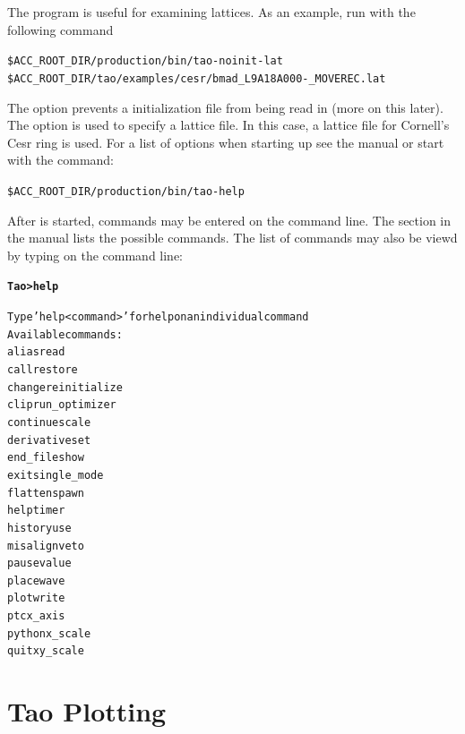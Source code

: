 \documentclass{hitec}
\newcommand{\BF}[1]{{\normalfont\textbf{#1}}}
\newenvironment{display}
  {\vspace*{-1.5ex} \begin{alltt}}
  {\end{alltt} \vspace*{-1.0ex}}
\begin{document}
The \tao program is useful for examining lattices. As an example, run \tao with
the following command
\begin{display}
  \$ACC_ROOT_DIR/production/bin/tao -noinit -lat \B
              \$ACC_ROOT_DIR/tao/examples/cesr/bmad_L9A18A000-_MOVEREC.lat
\end{display}
The  option prevents a \tao initialization file from being read in (more
on this later). The  option is used to specify a lattice file. In this case,
a lattice file for Cornell's Cesr ring is used. For a list of options when starting
up \tao see the \tao manual or start \tao with the command:
\begin{display}
  \$ACC_ROOT_DIR/production/bin/tao -help
\end{display}

After \tao is started, commands may be entered on the command line. The section
\tao {} in the \tao manual lists the possible commands. The list
of commands may also be viewd by typing  on the command line:
\begin{display}
  \BF{Tao> help}

  Type 'help <command>' for help on an individual command
  Available commands:
    alias                             read
    call                              restore
    change                            reinitialize
    clip                              run_optimizer
    continue                          scale
    derivative                        set
    end_file                          show
    exit                              single_mode
    flatten                           spawn
    help                              timer
    history                           use
    misalign                          veto
    pause                             value
    place                             wave
    plot                              write
    ptc                               x_axis
    python                            x_scale
    quit                              xy_scale
\end{display}

\section{Tao Plotting}
\end{document}
